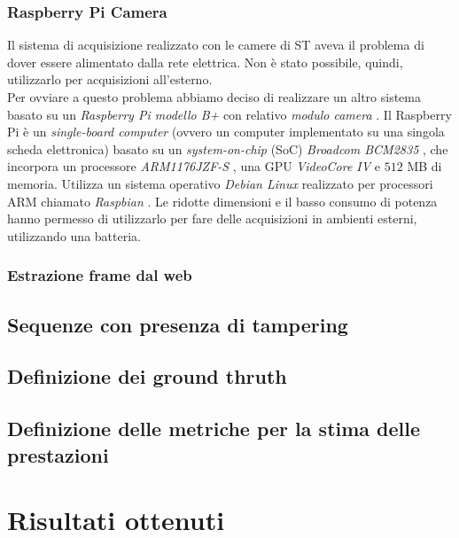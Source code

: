 \subsubsection{Raspberry Pi Camera}
Il sistema di acquisizione realizzato con le camere di ST aveva il problema di dover essere alimentato dalla rete elettrica.
Non \`e stato possibile, quindi, utilizzarlo per acquisizioni all'esterno.\\
Per ovviare a questo problema abbiamo deciso di realizzare un altro sistema basato su un \textit{Raspberry Pi modello B+} \cite{raspberry} con relativo \textit{modulo camera} \cite{raspberryCamera}.
Il Raspberry Pi \`e un \textit{single-board computer} (ovvero un computer implementato su una singola scheda elettronica) basato su un \textit{system-on-chip} (SoC) \textit{Broadcom BCM2835} \cite{broadcom}, che incorpora un processore \textit{ARM1176JZF-S} \cite{arm}, una GPU \textit{VideoCore IV} \cite{gpu} e $512$ MB di memoria.
Utilizza un sistema operativo \textit{Debian Linux} realizzato per processori ARM chiamato \textit{Raspbian} \cite{raspbian}.
Le ridotte dimensioni e il basso consumo di potenza hanno permesso di utilizzarlo per fare delle acquisizioni in ambienti esterni, utilizzando una batteria. 

\subsubsection{Estrazione frame dal web}

\subsection{Sequenze con presenza di tampering}
\subsection{Definizione dei ground thruth}
\subsection{Definizione delle metriche per la stima delle prestazioni}
\section{Risultati ottenuti}